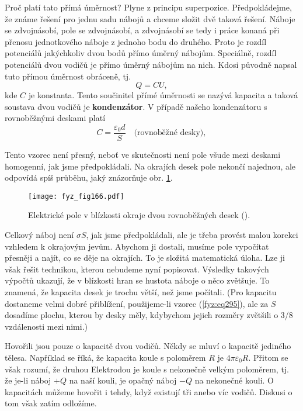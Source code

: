   Proč platí tato přímá úměrnost? Plyne z principu superpozice. Předpokládejme, že známe řešení pro 
  jednu sadu nábojů a chceme složit dvě taková řešení. Náboje se zdvojnásobí, pole se zdvojnásobí, 
  a zdvojnásobí se tedy i práce konaná při přenosu jednotkového náboje z jednoho bodu do druhého. 
  Proto je rozdíl potenciálů jakýchkoliv dvou bodů přímo úměrný nábojům. Speciálně, rozdíl 
  potenciálů dvou vodičů je přímo úměrný nábojům na nich. Kdosi původně napsal tuto přímou úměrnost 
  obráceně, tj.
  \begin{equation}\label{fyz:eq294}
    Q = CU,
  \end{equation}
  kde \(C\) je konstanta. Tento součinitel přímé úměrnosti se nazývá kapacita a taková soustava 
  dvou vodičů je \textbf{kondenzátor}. V případě našeho kondenzátoru s rovnoběžnými deskami platí
  \begin{equation}\label{fyz:eq295}
    C = \frac{\varepsilon_0d}{S} \quad\text{(rovnoběžné desky)},
  \end{equation}
  
  Tento vzorec není přesný, neboť ve skutečnosti není pole všude mezi deskami homogenní, jak jsme 
  předpokládali. Na okrajích desek pole nekončí najednou, ale odpovídá spíš průběhu,
  jaký znázorňuje obr. \ref{fyz:fig166}.
  
  \begin{figure}[ht!]  %
    \centering
    \texttt{[image: fyz\_fig166.pdf]}
    \caption{Elektrické pole v blízkosti okraje dvou rovnoběžných desek
             (\cite[s.~115]{Feynman02}).}
    \label{fyz:fig166}
  \end{figure}

  Celkový náboj není \(σS\), jak jsme předpokládali, ale je třeba provést malou korekci vzhledem k
  okrajovým jevům. Abychom ji dostali, musíme pole vypočítat přesněji a najít, co se děje na
  okrajích. To je složitá matematická úloha. Lze ji však řešit technikou, kterou nebudeme nyní
  popisovat. Výsledky takových výpočtů ukazují, že v blízkosti hran se hustota náboje o něco
  zvětšuje. To znamená, že kapacita desek je trochu větší, než jsme počítali. (Pro kapacitu
  dostaneme velmi dobré přiblížení, použijeme-li vzorec (\ref{fyz:eq295}), ale za \(S\) dosadíme
  plochu, kterou by desky měly, kdybychom jejich rozměry zvětšili o 3/8 vzdálenosti mezi nimi.)
  
  Hovořili jsou pouze o kapacitě dvou vodičů. Někdy se mluví o kapacitě jediného tělesa. Například
  se říká, že kapacita koule s poloměrem \(R\) je \(4π\varepsilon_0R\). Přitom se však rozumí, že druhou
  Elektrodou je koule s nekonečně velkým poloměrem, tj. že je-li náboj \(+Q\) na naší kouli, je
  opačný náboj \(-Q\) na nekonečné kouli. O kapacitách můžeme hovořit i tehdy, když existují tři
  anebo víc vodičů. Diskusi o tom však zatím odložíme.


